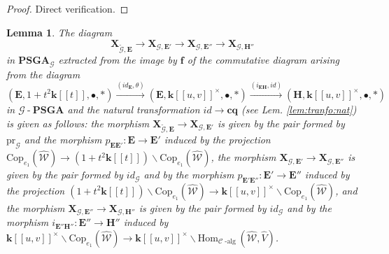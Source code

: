 \documentclass[10pt]{amsart}
\newtheorem{lem}[thm]{Lemma}
\numberwithin{equation}{subsection}
\begin{document}
\begin{proof}
Direct verification. 
\end{proof}


\begin{lem}\label{lem:def:p_UV}
The diagram 
$$
\mathbf X_{\tilde{\mathcal G},\mathbf{E}}\stackrel{}{\to}
\mathbf X_{\mathcal G,\mathbf{E}'}\stackrel{}{\to}
\mathbf X_{\mathcal G,\mathbf{E}''}\stackrel{}{\to}
\mathbf X_{\mathcal G,\mathbf{H}''}
$$ 
in $\mathbf{PSGA}_{\mathcal G}$
extracted from the image by $\mathbf f$ of the commutative diagram 
arising from the diagram 
\begin{equation}\label{diag:E:E:H}
(\mathbf E,1+t^2\mathbf k[[t]],\bullet,*)\stackrel{(id_{\mathbf E},\theta)}{\to}(\mathbf E,\mathbf k[[u,v]]^\times,\bullet,*)
\stackrel{(i_{\mathbf E\mathbf H},id)}{\to}(\mathbf H,\mathbf k[[u,v]]^\times,\bullet,*)    
\end{equation}
in $\mathcal G\operatorname{-}\mathbf{PSGA}$ and the natural transformation 
$id\to \mathbf c\mathbf q$ (see Lem. \ref{lem:tranfo:nat}) is given as follows: the morphism  $\mathbf X_{\tilde{\mathcal G},\mathbf{E}}\stackrel{}{\to}
\mathbf X_{\mathcal G,\mathbf{E}'}$ is given by the pair formed by $\mathrm{pr}_{\mathcal G}$ and the morphism $p_{\mathbf E\mathbf E'} : 
\mathbf E\to\mathbf E'$ induced by the projection 
$\mathrm{Cop}_{e_1}(\hat{\mathcal W})\to(1+t^2\mathbf k[[t]])\backslash \mathrm{Cop}_{e_1}(\hat{\mathcal W})$, the morphism 
$\mathbf X_{\mathcal G,\mathbf{E}'}\stackrel{}{\to}\mathbf X_{\mathcal G,\mathbf{E}''}$ is given by the pair formed by 
$id_{\mathcal G}$ and by the morphism $p_{\mathbf E'\mathbf E''} : \mathbf E'\to\mathbf E''$ induced by the projection
$(1+t^2\mathbf k[[t]])\backslash \mathrm{Cop}_{e_1}(\hat{\mathcal W})
\to\mathbf k[[u,v]]^\times\backslash \mathrm{Cop}_{e_1}(\hat{\mathcal W})$, 
and the morphism $\mathbf X_{\mathcal G,\mathbf{E}''}\stackrel{}{\to}
\mathbf X_{\mathcal G,\mathbf{H}''}$ is given by the pair formed by $id_{\mathcal G}$ and by the morphism 
$i_{\mathbf E''\mathbf H''} : \mathbf E''\to\mathbf H''$ induced by
$\mathbf k[[u,v]]^\times\backslash \mathrm{Cop}_{e_1}(\hat{\mathcal W})\to
\mathbf k[[u,v]]^\times\backslash \mathrm{Hom}_{\mathcal C\operatorname{-alg}}(\hat{\mathcal W},\hat V)$. 
\end{lem}
\end{document}
